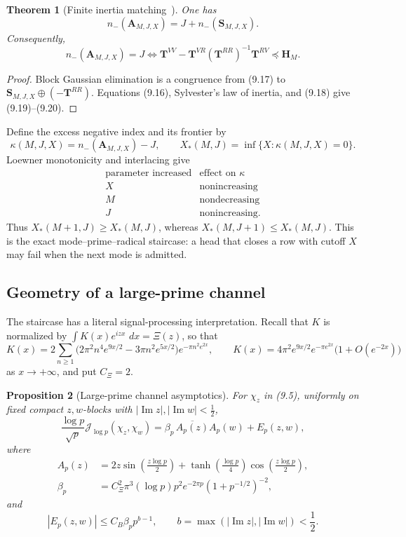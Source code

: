 \documentclass[11pt]{amsart}
\newtheorem{theorem}{Theorem}[section]
\newtheorem{proposition}[theorem]{Proposition}
\theoremstyle{definition}
\theoremstyle{remark}
\newcommand{\dd}{\,d}
\newcommand{\XiR}{\Xi}
\begin{document}
\begin{theorem}[Finite inertia matching~\cite{Haynsworth1968,Gantmacher1959}]
\label{thm:finite-inertia-matching}
One has
\[
 \boxed{
 n_-(\mathbf A_{M,J,X})
 =J+n_-(\mathbf S_{M,J,X}).}
\tag{9.19}
\]
Consequently,
\[
 \boxed{
 n_-(\mathbf A_{M,J,X})=J
 \Longleftrightarrow
 \mathbf T^{VV}
 -\mathbf T^{VR}(\mathbf T^{RR})^{-1}\mathbf T^{RV}
 \preceq\mathbf H_M.}
\tag{9.20}
\]
\end{theorem}

\begin{proof}
Block Gaussian elimination is a congruence from (9.17) to
\(\mathbf S_{M,J,X}\oplus(-\mathbf T^{RR})\).  Equations
(9.16), Sylvester's law of inertia, and (9.18) give (9.19)--(9.20).
\end{proof}

Define the excess negative index and its frontier by
\[
 \kappa(M,J,X)=n_-(\mathbf A_{M,J,X})-J,
\qquad
 X_*(M,J)=\inf\{X:\kappa(M,J,X)=0\}.
\tag{9.21}
\]
Loewner monotonicity and interlacing give
\cite{Bhatia1997}
\[
\begin{array}{c|c}
\text{parameter increased}&\text{effect on }\kappa\\ \hline
X&\text{nonincreasing}\\
M&\text{nondecreasing}\\
J&\text{nonincreasing}.
\end{array}
\tag{9.22}
\]
Thus \(X_*(M+1,J)\ge X_*(M,J)\), whereas
\(X_*(M,J+1)\le X_*(M,J)\).  This is the exact mode--prime--radical
staircase: a head that closes a row with cutoff \(X\) may fail when the
next mode is admitted.

\subsection{Geometry of a large-prime channel}

The staircase has a literal signal-processing interpretation.  Recall
that \(K\) is normalized by \(\int K(x)e^{izx}\,\dd x=\XiR(z)\), so that
\[
 K(x)=2\sum_{n\ge1}\bigl(2\pi^2n^4e^{9x/2}-3\pi n^2e^{5x/2}\bigr)
 e^{-\pi n^2e^{2x}},
 \qquad
 K(x)=4\pi^2e^{9x/2}e^{-\pi e^{2x}}\bigl(1+O(e^{-2x})\bigr)
\]
as \(x\to+\infty\), and put \(C_\Xi=2\).

\begin{proposition}[Large-prime channel asymptotics]
For
\(\chi_z\) in (9.5), uniformly on fixed compact \(z,w\)-blocks with
\(\lvert\operatorname{Im}z\rvert,\lvert\operatorname{Im}w\rvert<\frac12\),
\[
 \boxed{
 \frac{\log p}{\sqrt p}\mathcal J_{\log p}(\chi_z,\chi_w)
 =\beta_p\,\overline{A_p(z)}A_p(w)+E_p(z,w),}
\tag{9.23}
\]
where
\[
\begin{aligned}
 A_p(z)
 &=2z\sin\!\left(\frac{z\log p}{2}\right)
 +\tanh\!\left(\frac{\log p}{4}\right)
  \cos\!\left(\frac{z\log p}{2}\right),\\
 \beta_p
 &=C_\Xi^2\pi^3(\log p)p^2e^{-2\pi p}
   (1+p^{-1/2})^{-2},
\end{aligned}
\tag{9.24}
\]
and
\[
 |E_p(z,w)|\le C_B\beta_pp^{b-1},
 \qquad b=\max(|\operatorname{Im}z|,|\operatorname{Im}w|)<\frac12.
\tag{9.25}
\]
\end{proposition}
\end{document}
